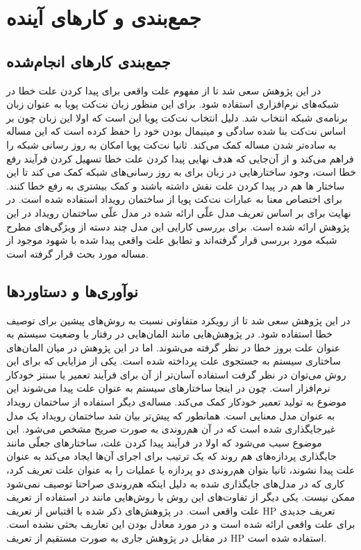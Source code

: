 \chapter{جمع‌بندی و کار‌های آینده}
\section{جمع‌بندی کار‌های انجام‌شده}
در این پژوهش سعی شد تا از مفهوم علت واقعی برای پیدا کردن علت خطا در شبکه‌های نرم‌افزاری استفاده شود.
برای این منظور زبان نت‌کت پویا به عنوان زبان برنامه‌ی‌ شبکه‌ انتخاب شد.
دلیل انتخاب نت‌کت پویا این است که اولا این زبان چون بر اساس نت‌کت بنا شده سادگی و مینیمال بودن خود را حفظ کرده است که این مساله به ساده‌تر شدن مساله کمک می‌کند.
ثانیا نت‌کت پویا امکان به روز‌ رسانی شبکه را فراهم می‌کند و از آن‌جایی که هدف نهایی پیدا کردن علت خطا تسهیل کردن فرآیند رفع خطا است، وجود ساختارهایی در زبان برای به روز رسانی‌های شبکه کمک می کند تا این ساختار ها هم در پیدا کردن علت نقش داشته باشند و کمک بیشتری به رفع خطا کنند.
 برای اختصاص معنا به عبارات نت‌کت پویا از ساختمان رویداد استفاده شده است.
 در نهایت برای بر اساس تعریف مدل علّی ارائه شده در
 \cite{hp}
 مدل علّی ساختمان رویداد در این پژوهش ارائه شده است.
 برای بررسی کارایی این مدل چند دسته از ویژگی‌های مطرح شبکه مورد بررسی قرار گرفته‌اند و تطابق علت واقعی پیدا شده با شهود موجود از مساله مورد بحث قرار گرفته است.

 \section{نوآوری‌ها و دستاورد‌ها}
در این پژوهش سعی شد تا از رویکرد متفاوتی نسبت به روش‌های پیشین برای توصیف خطا استفاده شود.
در پژوهش‌هایی مانند
\cite{causality-checking,causal-hml,chockler}
المان‌هایی در رفتار یا وضعیت سیستم به عنوان علت بروز خطا در نظر گرفته می‌شوند.
اما در این پژوهش در میان المان‌های ساختاری سیستم به جستجوی علت پرداخته شده است.
یکی از مزایایی که برای این روش می‌توان در نظر گرفت استفاده آسان‌تر از آن برای فرآیند تعمیر یا سنتز خودکار نرم‌افزار است. 
چون در اینجا ساختار‌های سیستم به عنوان علت پیدا می‌شوند این موضوع به تولید تعمیر خودکار کمک می‌کند.
مساله‌ی دیگر استفاده از ساختمان رویداد به عنوان مدل معنایی است.
همانطور که پیش‌تر بیان شد ساختمان رویداد یک مدل غیرجایگذاری شده است که در آن هم‌روندی به صورت صریح مشخص می‌شود.
این موضوع سبب می‌شود که اولا در فرآیند پیدا کردن علت، ساختار‌های جعلّی مانند جایگذاری پردازه‌های هم روند که یک ترتیب برای اجرای آن‌ها ایجاد می‌کند به عنوان علت پیدا نشوند، ثانیا بتوان هم‌روندی دو پردازه یا عملیات را به عنوان علت تعریف کرد، کاری که در مدل‌های جایگذاری شده به دلیل اینکه هم‌روندی صراحتا توصیف نمی‌شود ممکن نیست.
یکی دیگر از تفاوت‌های این روش با روش‌هایی مانند
\cite{causal-hml,causality-checking}
در استفاده از تعریف علت واقعی است.
در پژوهش‌های ذکر شده با اقتباس از تعریف
HP
تعریف جدیدی برای علت واقعی ارائه شده است و در مورد معادل بودن این تعاریف بحثی نشده است.
در مقابل در پژوهش جاری به صورت مستقیم از تعریف 
HP
استفاده شده است.

